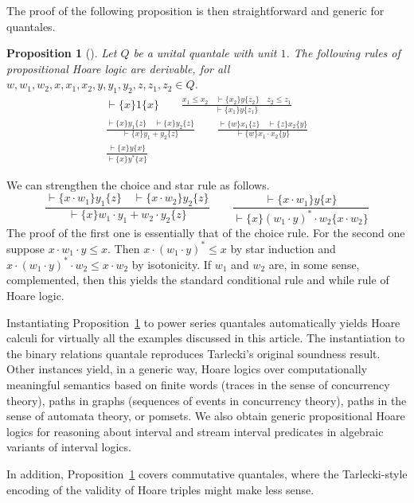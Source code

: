\documentclass[12pt]{article}
\newtheorem{proposition}{Proposition}
\theoremstyle{definition}
\begin{document}
The proof of the following proposition is then straightforward and
generic for quantales.
\begin{proposition}[\cite{HMSW11}]\label{prop:phl}
  Let $Q$ be a unital quantale with unit $1$. The following
  rules of propositional Hoare logic are derivable, for all
  $w, w_1, w_2,x,x_1,x_2,y,y_1,y_2,z,z_1,z_2\in Q$.
  \begin{gather*}
\vdash\{x\}1\{x\}
\qquad
\frac{x_1\le x_2\quad\vdash \{x_2\}y\{z_2\}\quad z_2\le z_1}{\vdash\{x_1\}y\{z_1\}}
\\
    \frac{\vdash\{x\}y_1\{z\}\quad\vdash\{x\}y_2\{z\}}{\vdash\{x\}y_1+y_2\{z\}}
\qquad
\frac{\vdash\{w\}x_1\{z\}\quad\vdash\{z\}x_2\{y\}}{\vdash\{w\}x_1\cdot x_2\{y\}}
\\
\frac{\vdash\{x\}y\{x\}}{\vdash\{x\}y^\ast\{x\}}
  \end{gather*}
\end{proposition}
We can strengthen the choice and star rule  as follows.
\begin{equation*}
  \frac{\vdash\{x\cdot w_1\} y_1\{z\}\quad\vdash\{x\cdot w_2\}y_2\{z\}}{\vdash\{x\}w_1\cdot y_1+w_2\cdot y_2\{z\}}
\qquad 
\frac{\vdash\{x\cdot w_1\}y\{x\}}{\vdash\{x\}(w_1\cdot y)^\ast\cdot w_2\{x\cdot w_2\}}
\end{equation*}
The proof of the first one is essentially that of the choice rule. For
the second one suppose $x\cdot w_1\cdot y\le x$. Then $x\cdot
(w_1\cdot y)^\ast \le x$ by star induction and $x\cdot (w_1\cdot
y)^\ast\cdot w_2\le x\cdot w_2$ by isotonicity. If $w_1$ and $w_2$
are, in some sense, complemented, then this yields the standard
conditional rule and while rule of Hoare logic.

Instantiating Proposition~\ref{prop:phl} to power series quantales
automatically yields Hoare calculi for virtually all the examples
discussed in this article. The instantiation to the binary relations
quantale reproduces Tarlecki's original soundness result. Other
instances yield, in a generic way, Hoare logics over computationally
meaningful semantics based on finite words (traces in the sense of
concurrency theory), paths in graphs (sequences of events in
concurrency theory), paths in the sense of automata theory, or
pomsets. We also obtain generic propositional Hoare logics for
reasoning about interval and stream interval predicates in algebraic
variants of interval logics.



In addition, Proposition~\ref{prop:phl} covers commutative quantales,
where the Tarlecki-style encoding of the validity of Hoare triples
might make less sense. 
\end{document}
